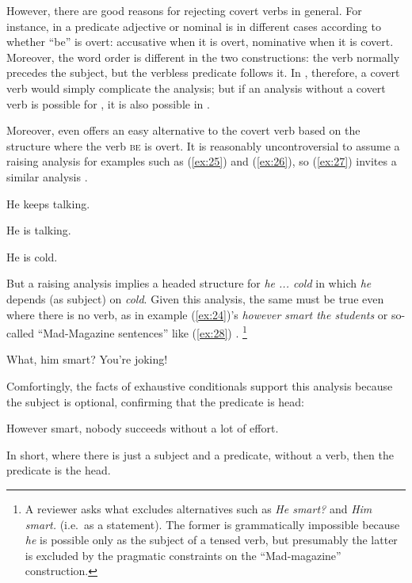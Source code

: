 \documentclass[output=paper
 	        ,biblatex
                ,babelshorthands
                ,newtxmath
                ,draftmode
                ,colorlinks, citecolor=brown
]{langscibook}
\begin{document}
However, there are good reasons for rejecting covert verbs in general. For instance, in  a predicate adjective or nominal is in different cases according to whether ``be'' is overt: accusative when it is overt, nominative when it is covert. Moreover, the word order is different in the two constructions: the verb normally precedes the subject, but the verbless predicate follows it. In , therefore, a covert verb would simply complicate the analysis; but if an analysis without a covert verb is possible for , it is also possible in .

Moreover, even  offers an easy alternative to the covert verb based on the structure where the verb \textsc{be} is overt. It is reasonably uncontroversial to assume a raising analysis for examples such as (\ref{ex:25}) and (\ref{ex:26}), so (\ref{ex:27}) invites a similar analysis \citep{MuellerCopula}.

\eal
\ex \label{ex:25} He keeps talking.

\ex \label{ex:26} He is talking.

\ex \label{ex:27} He is cold.
\zl

But a raising analysis implies a headed structure for \emph{he ... cold} in which \emph{he} depends (as subject) on \emph{cold}. Given this analysis, the same must be true even where there is no verb, as in example (\ref{ex:24})'s \emph{however smart the students} or so-called ``Mad-Magazine sentences'' like (\ref{ex:28}) \citep{Lambrecht:90}.%
%
\footnote{A reviewer asks what excludes alternatives such as \emph{He smart?} and \emph{Him smart.} (i.e.\ as a statement). The former is grammatically impossible because \emph{he} is possible only as the subject of a tensed verb, but presumably the latter is excluded by the pragmatic constraints on the ``Mad-magazine'' construction.}%
%

\begin{exe}
	\ex \label{ex:28} What, him smart? You’re joking!
\end{exe}

Comfortingly, the facts of exhaustive conditionals support this analysis because the subject is optional, confirming that the predicate is head:

\begin{exe}
	\ex \label{ex:29} However smart, nobody succeeds without a lot of effort.
\end{exe}

In short, where there is just a subject and a predicate, without a verb, then the predicate is the head.
\end{document}
